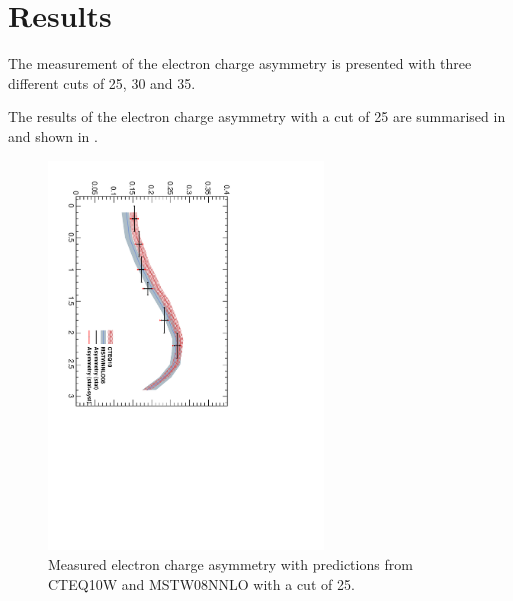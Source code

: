 \section{Results}
The measurement of the electron charge asymmetry is presented with three
different \pT cuts of 25, 30 and \unit{35}{\GeV}. 

The results of the electron charge asymmetry with a \pT cut of \unit{25}{\GeV}
are summarised in  and shown in .

\begin{figure}[htbp]
  \begin{center}
  \includegraphics*[width=0.65\textwidth,angle=90]{Asym_25}
  \caption{\label{fig:asym25} Measured electron charge asymmetry with
predictions from CTEQ10W and MSTW08NNLO with a \pT cut of \unit{25}{\GeV}.}
  \end{center}
\end{figure}


